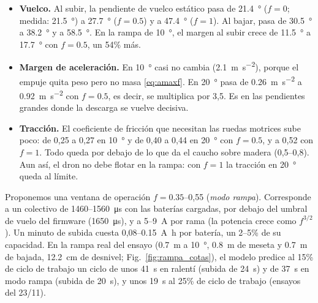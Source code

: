 \begin{itemize}
  \item \textbf{Vuelco.} Al subir, la pendiente de vuelco estático pasa de \SI{21.4}{\degree} ($f=0$; medida: \SI{21.5}{\degree}) a \SI{27.7}{\degree} ($f=0.5$) y a \SI{47.4}{\degree} ($f=1$). Al bajar, pasa de \SI{30.5}{\degree} a \SI{38.2}{\degree} y a \SI{58.5}{\degree}. En la rampa de \SI{10}{\degree}, el margen al subir crece de \SI{11.5}{\degree} a \SI{17.7}{\degree} con $f=0.5$, un 54\% más.
  \item \textbf{Margen de aceleración.} En \SI{10}{\degree} casi no cambia (\SI{2.1}{\metre\per\second\squared}), porque el empuje quita peso pero no masa \eqref{eq:amaxf}. En \SI{20}{\degree} pasa de \SI{0.26}{\metre\per\second\squared} a \SI{0.92}{\metre\per\second\squared} con $f=0.5$, es decir, se multiplica por 3,5. Es en las pendientes grandes donde la descarga se vuelve decisiva.
  \item \textbf{Tracción.} El coeficiente de fricción que necesitan las ruedas motrices sube poco: de 0,25 a 0,27 en \SI{10}{\degree} y de 0,40 a 0,44 en \SI{20}{\degree} con $f=0.5$, y a 0,52 con $f=1$. Todo queda por debajo de lo que da el caucho sobre madera (0,5--0,8). Aun así, el dron no debe flotar en la rampa: con $f=1$ la tracción en \SI{20}{\degree} queda al límite.
\end{itemize}
Proponemos una ventana de operación $f=0.35$--0,55 (\emph{modo rampa}). Corresponde a un colectivo de 1460--\SI{1560}{\micro\second} con las baterías cargadas, por debajo del umbral de vuelo del firmware (\SI{1650}{\micro\second}), y a 5--\SI{9}{\ampere} por rama (la potencia crece como $f^{3/2}$). Un minuto de subida cuesta 0,08--\SI{0.15}{\ampere\hour} por batería, un 2--5\% de su capacidad. En la rampa real del ensayo (\SI{0.7}{\metre} a \SI{10}{\degree}, \SI{0.8}{\metre} de meseta y \SI{0.7}{\metre} de bajada, \SI{12.2}{\centi\metre} de desnivel; Fig.~\ref{fig:rampa_cotas}), el modelo predice al 15\% de ciclo de trabajo un ciclo de unos \SI{41}{\second} en ralentí (subida de \SI{24}{\second}) y de \SI{37}{\second} en modo rampa (subida de \SI{20}{\second}), y unos \SI{19}{\second} al 25\% de ciclo de trabajo (ensayos del 23/11).

